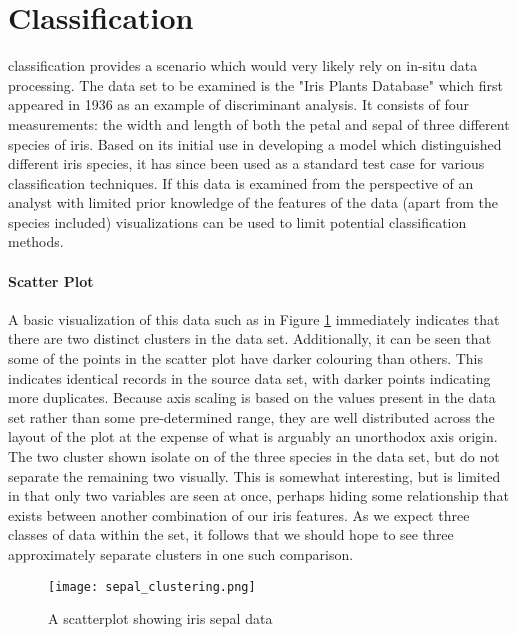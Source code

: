 \section{Classification}
\label{sec:classification}
 classification provides a scenario which would very likely rely on in-situ data processing. The data set to be examined is the "Iris Plants Database" \cite{Fisher1936} which first appeared in 1936 as an example of discriminant analysis. It consists of four measurements: the width and length of both the petal and sepal of three different species of iris. Based on its initial use in developing a model which distinguished different iris species, it has since been used as a standard test case for various classification techniques. If this data is examined from the perspective of an analyst with limited prior knowledge of the features of the data (apart from the species included) visualizations can be used to limit potential classification methods. 

\paragraph{Scatter Plot}
A basic visualization of this data such as in Figure \ref{fig:sepal_clustering} immediately indicates that there are two distinct clusters in the data set.  Additionally, it can be seen that some of the points in the scatter plot have darker colouring than others. This indicates identical records in the source data set, with darker points indicating more duplicates. Because axis scaling is based on the values present in the data set rather than some pre-determined range, they are well distributed across the layout of the plot at the expense of what is arguably an unorthodox axis origin. The two cluster shown isolate on of the three species in the data set, but do not separate the remaining two visually. This is somewhat interesting, but is limited in that only two variables are seen at once, perhaps hiding some relationship that exists between another combination of our iris features. As we expect three classes of data within the set, it follows that we should hope to see three approximately separate clusters in one such comparison.

\begin{figure}
	\centering
	\label{fig:sepal_clustering}
	\texttt{[image: sepal\_clustering.png]}
	\caption{A scatterplot showing iris sepal data}
\end{figure}

